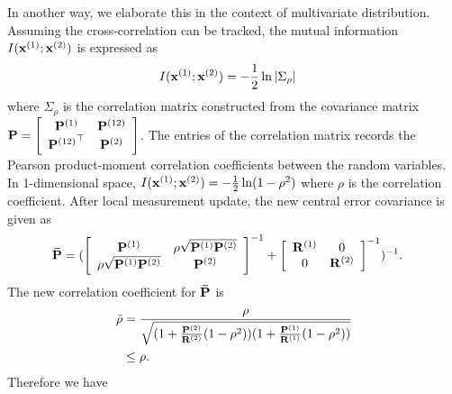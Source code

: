 In another way, we elaborate this in the context of multivariate distribution. Assuming the cross-correlation can be tracked, the mutual information $I({\bf x}^{(1)};{\bf x}^{(2)})$ is expressed as
\begin{equation}
\begin{split}
I({\bf x}^{(1)};{\bf x}^{(2)})&=-\frac{1}{2}\ln|\Sigma_\rho|
\end{split}
\end{equation}
where $\Sigma_\rho$ is the correlation matrix constructed from the covariance matrix ${\bf P}=\left[                      \begin{array}{cc}
{\bf P}^{(1)} & {\bf P}^{(12)}\\                   {{\bf P}^{(12)}}^\top & {\bf P}^{(2)} \\          \end{array}\right]
$. The entries of the correlation matrix  records the Pearson product-moment correlation coefficients between the random variables. In 1-dimensional space, $I({\bf x}^{(1)};{\bf x}^{(2)})=-\frac{1}{2}\ln(1-\rho^2)$ where $\rho$ is the correlation coefficient. After local measurement update, the new central error covariance is given as
\begin{equation}
\begin{split}
{\bf\bar P}&=(\left[                    \begin{array}{cc}{\bf P}^{(1)} & \rho\sqrt{{\bf P}^{(1)}{\bf P}^{(2)}}\\                       \rho\sqrt{{\bf P}^{(1)}{\bf P}^{(2)}} & {\bf P}^{(2)} \\\end{array}\right]^{-1}+\left[         \begin{array}{cc}                      {\bf R}^{(1)} & 0 \\                      0 & {\bf R}^{(2)} \\\end{array}\right]^{-1})^{-1}.
\end{split}
\end{equation}
The new correlation coefficient for $\bf{\bar P}$ is
\begin{equation}
\begin{split}
\bar\rho&=\frac{\rho}{\sqrt{(1+\frac{{\bf P}^{(2)}}{{\bf R}^{(2)}}(1-\rho^2))(1+\frac{{\bf P}^{(1)}}{{\bf R}^{(1)}}(1-\rho^2))}} \\
&\leq\rho.
\end{split}
\end{equation}
Therefore we have
